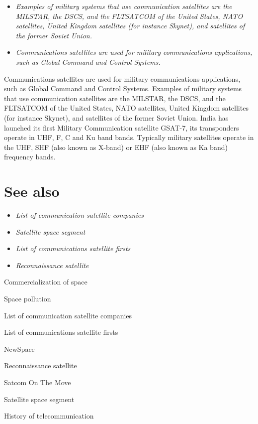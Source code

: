 \begin{itemize}
\item
  \emph{Examples of military systems that use communication satellites
  are the MILSTAR, the DSCS, and the FLTSATCOM of the United States,
  NATO satellites, United Kingdom satellites (for instance Skynet), and
  satellites of the former Soviet Union.}
\item
  \emph{Communications satellites are used for military communications
  applications, such as Global Command and Control Systems.}
\end{itemize}

Communications satellites are used for military communications
applications, such as Global Command and Control Systems. Examples of
military systems that use communication satellites are the MILSTAR, the
DSCS, and the FLTSATCOM of the United States, NATO satellites, United
Kingdom satellites (for instance Skynet), and satellites of the former
Soviet Union. India has launched its first Military Communication
satellite GSAT-7, its transponders operate in UHF, F, C and Ku band
bands. Typically military satellites operate in the UHF, SHF (also known
as X-band) or EHF (also known as Ka band) frequency bands.

\section{See also}\label{see-also}

\begin{itemize}
\item
  \emph{List of communication satellite companies}
\item
  \emph{Satellite space segment}
\item
  \emph{List of communications satellite firsts}
\item
  \emph{Reconnaissance satellite}
\end{itemize}

Commercialization of space

Space pollution

List of communication satellite companies

List of communications satellite firsts

NewSpace

Reconnaissance satellite

Satcom On The Move

Satellite space segment

History of telecommunication

